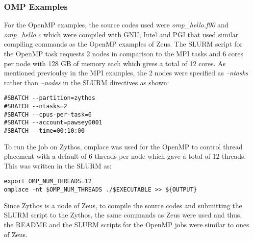 \subsubsection{OMP Examples}

For the OpenMP examples, the source codes used were \emph{omp\_hello.f90} and \emph{omp\_hello.c} which were compiled with GNU, Intel and PGI 
that used similar compiling commands as the OpenMP examples of Zeus. The SLURM script for the OpenMP task requests 2 nodes in comparison to the MPI tasks 
and 6 cores per node with 128 GB of memory each which gives a total of 12 cores. As mentioned previoulsy in the MPI examples, the 2 nodes were specified 
as \emph{--ntasks} rather than \emph{--nodes} in the SLURM directives as shown:

\begin{tcolorbox}
\begin{Verbatim}[fontsize=\scriptsize]
#SBATCH --partition=zythos
#SBATCH --ntasks=2
#SBATCH --cpus-per-task=6
#SBATCH --account=pawsey0001
#SBATCH --time=00:10:00
\end{Verbatim}
\end{tcolorbox}

To run the job on Zythos, omplace was used for the OpenMP to control thread placement with a default of 6 threads per node which gave a total of 12 
threads. This was written in the SLURM as:

\begin{tcolorbox}
\begin{Verbatim}[fontsize=\scriptsize]
export OMP_NUM_THREADS=12
omplace -nt $OMP_NUM_THREADS ./$EXECUTABLE >> ${OUTPUT}
\end{Verbatim}
\end{tcolorbox}

Since Zythos is a node of Zeus, to compile the source codes and submitting the SLURM script to the Zythos, the same commands as Zeus were used and thus,
the README and the SLURM scripts for the OpenMP jobs were similar to ones of Zeus.

